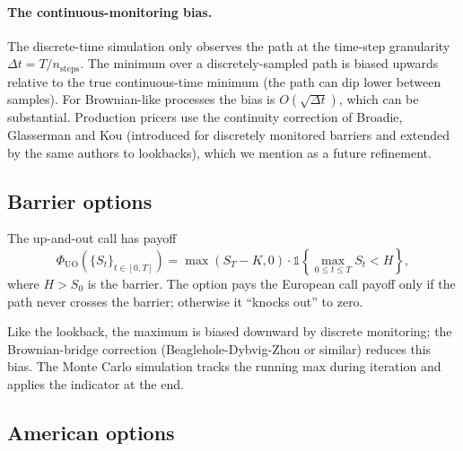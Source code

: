 \documentclass[11pt]{article}
\theoremstyle{plain}
\theoremstyle{definition}
\theoremstyle{remark}
\begin{document}
\paragraph{The continuous-monitoring bias.} The discrete-time simulation only observes the path at the time-step granularity $\Delta t = T / n_{\mathrm{steps}}$. The minimum over a discretely-sampled path is biased upwards relative to the true continuous-time minimum (the path can dip lower between samples). For Brownian-like processes the bias is $O(\sqrt{\Delta t})$, which can be substantial. Production pricers use the continuity correction of Broadie, Glasserman and Kou \cite{BroadieGlassermanKou1997} (introduced for discretely monitored barriers and extended by the same authors to lookbacks), which we mention as a future refinement.

\subsection{Barrier options}

The up-and-out call has payoff
\begin{equation}
    \Phi_{\mathrm{UO}}(\{S_t\}_{t \in [0, T]}) = \max(S_T - K, 0) \cdot \mathbb{1}\!\left\{\max_{0 \leq t \leq T} S_t < H\right\},                                                                       \label{eq:uo-payoff}
\end{equation}
where $H > S_0$ is the barrier. The option pays the European call payoff only if the path never crosses the barrier; otherwise it ``knocks out'' to zero.

Like the lookback, the maximum is biased downward by discrete monitoring; the Brownian-bridge correction (Beaglehole-Dybvig-Zhou or similar) reduces this bias. The Monte Carlo simulation tracks the running max during iteration and applies the indicator at the end.

\subsection{American options}
\end{document}
